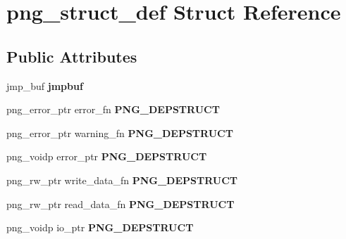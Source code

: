 \hypertarget{structpng__struct__def}{\section{png\-\_\-struct\-\_\-def Struct Reference}
\label{structpng__struct__def}
}
\subsection*{Public Attributes}
\begin{DoxyCompactItemize}
\item 
\hypertarget{structpng__struct__def_a612a97110a82e8481d68bb7ef47f6224}{jmp\-\_\-buf {\bfseries jmpbuf}}\label{structpng__struct__def_a612a97110a82e8481d68bb7ef47f6224}

\item 
\hypertarget{structpng__struct__def_ac29452ea33fb62ad839147c6527b0d76}{png\-\_\-error\-\_\-ptr error\-\_\-fn {\bfseries P\-N\-G\-\_\-\-D\-E\-P\-S\-T\-R\-U\-C\-T}}\label{structpng__struct__def_ac29452ea33fb62ad839147c6527b0d76}

\item 
\hypertarget{structpng__struct__def_a4ade3c867ed83447c5a9e1c3c4285063}{png\-\_\-error\-\_\-ptr warning\-\_\-fn {\bfseries P\-N\-G\-\_\-\-D\-E\-P\-S\-T\-R\-U\-C\-T}}\label{structpng__struct__def_a4ade3c867ed83447c5a9e1c3c4285063}

\item 
\hypertarget{structpng__struct__def_a8cd6eb178b9638c129ad79fed4c0c88e}{png\-\_\-voidp error\-\_\-ptr {\bfseries P\-N\-G\-\_\-\-D\-E\-P\-S\-T\-R\-U\-C\-T}}\label{structpng__struct__def_a8cd6eb178b9638c129ad79fed4c0c88e}

\item 
\hypertarget{structpng__struct__def_a5d2681754ffca935ea0656aa55a90d1a}{png\-\_\-rw\-\_\-ptr write\-\_\-data\-\_\-fn {\bfseries P\-N\-G\-\_\-\-D\-E\-P\-S\-T\-R\-U\-C\-T}}\label{structpng__struct__def_a5d2681754ffca935ea0656aa55a90d1a}

\item 
\hypertarget{structpng__struct__def_a55d91661d6d4474bb7440374798216a1}{png\-\_\-rw\-\_\-ptr read\-\_\-data\-\_\-fn {\bfseries P\-N\-G\-\_\-\-D\-E\-P\-S\-T\-R\-U\-C\-T}}\label{structpng__struct__def_a55d91661d6d4474bb7440374798216a1}

\item 
\hypertarget{structpng__struct__def_af7e9a211e6f65819fd57ba524b64dbda}{png\-\_\-voidp io\-\_\-ptr {\bfseries P\-N\-G\-\_\-\-D\-E\-P\-S\-T\-R\-U\-C\-T}}\label{structpng__struct__def_af7e9a211e6f65819fd57ba524b64dbda}


\end{DoxyCompactItemize}
